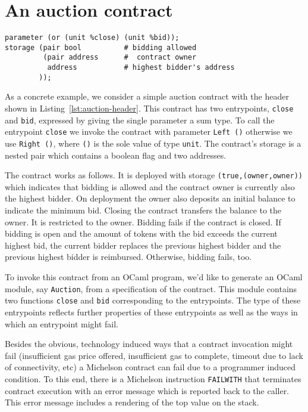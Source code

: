 \documentclass[a4paper,USenglish,american,cleveref, autoref, thm-restate]{oasics-v2021}
\begin{document}
\section{An auction contract}
\label{sec:an-auction-contract}
\begin{lstlisting}[float,caption={Simple auction contract (auction.tz)},captionpos=b,label={lst:auction-header},language=michelson,numbers=none,emph={close,bid},emphstyle=\underbar]
parameter (or (unit %close) (unit %bid));
storage (pair bool          # bidding allowed
         (pair address      #  contract owner
          address           # highest bidder's address
        ));
\end{lstlisting}

As a concrete example, we consider a simple auction contract with the
header shown in Listing~\ref{lst:auction-header}. 
This contract has two entrypoints, \lstinline/close/ and \lstinline/bid/,
expressed by giving the single parameter a sum type. To call the
entrypoint \lstinline/close/ we invoke the contract with parameter \lstinline/Left ()/
otherwise we use \lstinline/Right ()/, where \lstinline/()/ is the sole
value of type \lstinline/unit/. The contract's storage is a nested pair which
contains a boolean flag and two addresses.

The contract works as follows. It is deployed with storage
\lstinline/(true,(owner,owner))/ which indicates that bidding is
allowed and the contract owner is currently also the highest
bidder. On deployment the owner also deposits an initial balance to indicate the
minimum bid. Closing the contract transfers the balance to the
owner. It is restricted to the owner. Bidding fails if the contract is
closed. If bidding is open and the amount of tokens with the bid exceeds the
current highest bid, the current bidder replaces the previous highest
bidder and the previous highest bidder is reimbursed. Otherwise,
bidding fails, too.

To invoke this contract from an OCaml program, we'd like to generate an
OCaml module, say \lstinline/Auction/, from a specification of the
contract. This module contains two functions
\lstinline/close/ and \lstinline/bid/ corresponding to the
entrypoints. The type of these entrypoints reflects further properties
of these entrypoints as well as the ways in which an entrypoint might
fail.

Besides the obvious, technology induced ways that a contract invocation might fail
(insufficient gas price offered, insufficient gas to complete, timeout
due to lack of connectivity, etc) a Michelson contract can fail due to
a programmer induced condition. To this end, there is a Michelson
instruction \lstinline/FAILWITH/ that terminates contract execution
with an error message which is reported back to the caller. This error
message includes a rendering of the top value on the stack.
\end{document}
